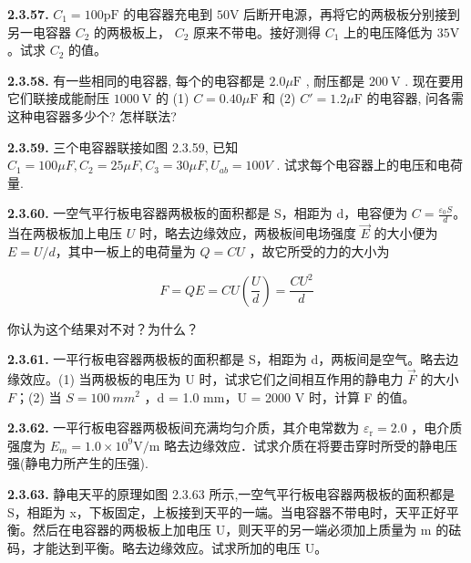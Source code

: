 \vfill
\newpage

\textbf{2.3.57.} $C_1 = 100\mathrm{pF}$ 的电容器充电到 $50\mathrm{V}$ 后断开电源，再将它的两极板分别接到另一电容器 $C_2$ 的两极板上， $C_2$ 原来不带电。接好测得 $C_1$ 上的电压降低为 $35\mathrm{V}$ 。试求 $C_2$ 的值。

\vfill
\newpage

\textbf{2.3.58.} 有一些相同的电容器, 每个的电容都是 $2.0 \mu \mathrm{F}$ , 耐压都是 $200 \mathrm{~V}$ . 现在要用它们联接成能耐压 $1000 \mathrm{~V}$ 的 (1) $C = 0.40 \mu \mathrm{F}$ 和 (2) $C' = 1.2 \mu \mathrm{F}$ 的电容器, 问各需这种电容器多少个? 怎样联法?

\vfill
\newpage

\textbf{2.3.59.} 三个电容器联接如图 2.3.59, 已知 $C_{1}=100\mu F, C_{2}=25\mu F, C_{3}=30\mu F, U_{ab}=100V$ . 试求每个电容器上的电压和电荷量.

\vfill
\newpage

\textbf{2.3.60.} 一空气平行板电容器两极板的面积都是 S，相距为 d，电容便为 $\displaystyle C=\frac{\varepsilon_0S}{d}$。当在两极板加上电压 $U$ 时，略去边缘效应，两极板间电场强度 $\vec{E}$ 的大小便为 $E = U / d$，其中一板上的电荷量为 $Q = CU$ ，故它所受的力的大小为

\[
F = Q E = C U \left(\frac {U}{d}\right) = \frac {C U ^ {2}}{d}
\]

你认为这个结果对不对？为什么？

\vfill
\newpage

\textbf{2.3.61.} 一平行板电容器两极板的面积都是 S，相距为 d，两板间是空气。略去边缘效应。(1) 当两极板的电压为 U 时，试求它们之间相互作用的静电力 $\vec{F}$ 的大小 $F$；(2) 当 $S = 100 ~mm^{2}$ ，d = 1.0 mm，U = 2000 V 时，计算 F 的值。

\vfill
\newpage

\textbf{2.3.62.} 一平行板电容器两极板间充满均匀介质，其介电常数为 $\varepsilon_{\mathrm{r}} = 2.0$ ，电介质强度为 $E_{m} = 1.0\times 10^{9}\mathrm{V / m}$ 略去边缘效应．试求介质在将要击穿时所受的静电压强(静电力所产生的压强).

\vfill
\newpage

\textbf{2.3.63.} 静电天平的原理如图 2.3.63 所示,一空气平行板电容器两极板的面积都是 S，相距为 x，下板固定，上板接到天平的一端。当电容器不带电时，天平正好平衡。然后在电容器的两极板上加电压 U，则天平的另一端必须加上质量为 m 的砝码，才能达到平衡。略去边缘效应。试求所加的电压 U。

\begin{center}
\end{center}

